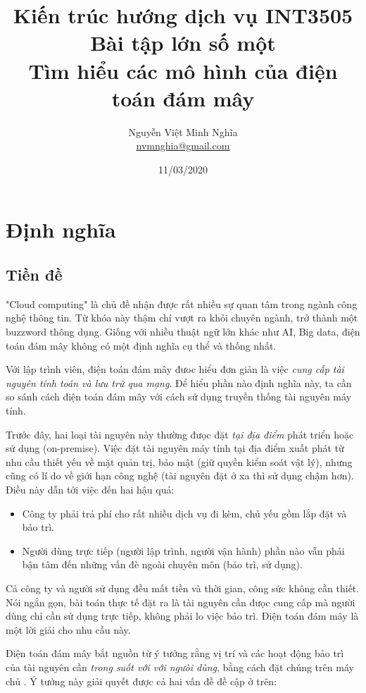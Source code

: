 \documentclass{article}
\author{Nguyễn Việt Minh Nghĩa \\ \href{mailto:nvmnghia@gmail.com}{nvmnghia@gmail.com}}
\date{11/03/2020}
\title{Kiến trúc hướng dịch vụ INT3505 \\ Bài tập lớn số một \\ Tìm hiểu các mô hình của điện toán đám mây}
\begin{document}
\maketitle

\section{Định nghĩa}

\subsection{Tiền đề}

"Cloud computing" là chủ đề nhận được rất nhiều sự quan tâm trong ngành công
nghệ thông tin. Từ khóa này thậm chí vượt ra khỏi chuyên ngành, trở thành một
buzzword thông dụng. Giống với nhiều thuật ngữ lớn khác như AI, Big data, điện
toán đám mây không có một định nghĩa cụ thể và thống nhất.

Với lập trình viên, điện toán đám mây đưoc hiểu đơn giản là việc \emph{cung cấp
tài nguyên tính toán và lưu trữ qua mạng}. Để hiểu phần nào định nghĩa này, ta
cần so sánh cách điện toán đám mây với cách sử dụng truyền thống tài nguyên máy
tính.

Trước đây, hai loại tài nguyên này thường đưọc đặt \emph{tại địa điểm} phát
triển hoặc sử dụng (on-premise). Việc đặt tài nguyên máy tính tại địa điểm xuất
phát từ nhu cầu thiết yếu về mặt quản trị, bảo mật (giữ quyền kiểm soát vật lý),
nhưng cũng có lí do về giới hạn công nghệ (tài nguyên đặt ở xa thì sử dụng chậm
hơn). Điều này dẫn tới việc đến hai hậu quả:

\begin{itemize}
    \item Công ty phải trả phí cho rất nhiều dịch vụ đi kèm, chủ yếu gồm lắp đặt
    và bảo trì.
    \item Người dùng trực tiếp (người lập trình, người vận hành) phần nào vẫn
    phải bận tâm đến những vấn đè ngoài chuyên môn (bảo trì, sử dụng).
\end{itemize}

Cả công ty và người sử dụng đều mất tiền và thời gian, công sức không cần thiết.
Nói ngắn gọn, bài toán thực tế đặt ra là tài nguyên cần đưọc cung cấp mà người
dùng chỉ cần sử dụng trực tiếp, không phải lo việc bảo trì. Điện toán đám mây là
một lời giải cho nhu cầu này.

Điện toán đám mây bắt nguồn từ ý tưởng rằng vị trí và các hoạt động bảo trì của
tài nguyên cần \emph{trong suốt với với ngưòi dùng}, bằng cách đặt chúng trên
máy chủ \cite{SES2006}. Ý tưởng này giải quyết được cả hai vấn đề đề cập ở trên:
\end{document}
